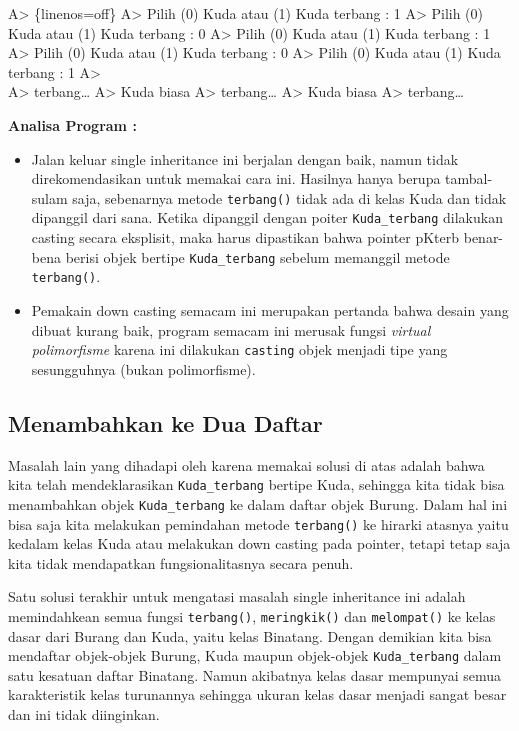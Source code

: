 A\textgreater{} \{linenos=off\} A\textgreater{} Pilih (0) Kuda atau (1)
Kuda terbang : 1 A\textgreater{} Pilih (0) Kuda atau (1) Kuda terbang :
0 A\textgreater{} Pilih (0) Kuda atau (1) Kuda terbang : 1
A\textgreater{} Pilih (0) Kuda atau (1) Kuda terbang : 0 A\textgreater{}
Pilih (0) Kuda atau (1) Kuda terbang : 1 A\textgreater{}\\
A\textgreater{} terbang\ldots{} A\textgreater{} Kuda biasa
A\textgreater{} terbang\ldots{} A\textgreater{} Kuda biasa
A\textgreater{} terbang\ldots{}

\textbf{Analisa Program :}

\begin{itemize}
\tightlist
\item
  Jalan keluar single inheritance ini berjalan dengan baik, namun tidak
  direkomendasikan untuk memakai cara ini. Hasilnya hanya berupa
  tambal-sulam saja, sebenarnya metode \texttt{terbang()} tidak ada di
  kelas Kuda dan tidak dipanggil dari sana. Ketika dipanggil dengan
  poiter \texttt{Kuda\_terbang} dilakukan casting secara eksplisit, maka
  harus dipastikan bahwa pointer pKterb benar-bena berisi objek bertipe
  \texttt{Kuda\_terbang} sebelum memanggil metode \texttt{terbang()}.
\item
  Pemakain down casting semacam ini merupakan pertanda bahwa desain yang
  dibuat kurang baik, program semacam ini merusak fungsi \emph{virtual
  polimorfisme} karena ini dilakukan \texttt{casting} objek menjadi tipe
  yang sesungguhnya (bukan polimorfisme).
\end{itemize}

\subsection{Menambahkan ke Dua Daftar}\label{menambahkan-ke-dua-daftar}

Masalah lain yang dihadapi oleh karena memakai solusi di atas adalah
bahwa kita telah mendeklarasikan \texttt{Kuda\_terbang} bertipe Kuda,
sehingga kita tidak bisa menambahkan objek \texttt{Kuda\_terbang} ke
dalam daftar objek Burung. Dalam hal ini bisa saja kita melakukan
pemindahan metode \texttt{terbang()} ke hirarki atasnya yaitu kedalam
kelas Kuda atau melakukan down casting pada pointer, tetapi tetap saja
kita tidak mendapatkan fungsionalitasnya secara penuh.

Satu solusi terakhir untuk mengatasi masalah single inheritance ini
adalah memindahkean semua fungsi \texttt{terbang()},
\texttt{meringkik()} dan \texttt{melompat()} ke kelas dasar dari Burang
dan Kuda, yaitu kelas Binatang. Dengan demikian kita bisa mendaftar
objek-objek Burung, Kuda maupun objek-objek \texttt{Kuda\_terbang} dalam
satu kesatuan daftar Binatang. Namun akibatnya kelas dasar mempunyai
semua karakteristik kelas turunannya sehingga ukuran kelas dasar menjadi
sangat besar dan ini tidak diinginkan.


